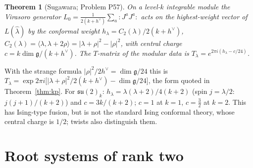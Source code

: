 \documentclass[11pt]{article}
\newtheorem{theorem}{Theorem}[section]
\theoremstyle{definition}
\theoremstyle{remark}
\begin{document}
\begin{theorem}[Sugawara; Problem P57]\label{thm:sugawara}
On a level-$k$ integrable module the Virasoro generator
$L_0 = \tfrac{1}{2(k+h^\vee)}\sum_a{:}J^aJ^a{:}$ acts on the highest-weight
vector of $L(\hat\lambda)$ by the \emph{conformal weight}
$h_\lambda = C_2(\lambda)/2(k+h^\vee)$,
$C_2(\lambda) = \langle\lambda,\lambda+2\rho\rangle = |\lambda+\rho|^2-|\rho|^2$,
with \emph{central charge} $c = k\dim\mathfrak g/(k+h^\vee)$. The
$T$-matrix of the modular data is $T_\lambda = e^{2\pi i(h_\lambda-c/24)}$.
\end{theorem}

With the strange formula $|\rho|^2/2h^\vee = \dim\mathfrak g/24$ this is
$T_\lambda = \exp2\pi i\big[|\lambda+\rho|^2/2(k+h^\vee)-\dim\mathfrak g/24\big]$,
the form quoted in Theorem~\ref{thm:kp}. For $\mathfrak{su}(2)_k$:
$h_\lambda = \lambda(\lambda+2)/4(k+2)$ (spin $j = \lambda/2$:
$j(j+1)/(k+2)$) and $c = 3k/(k+2)$; $c = 1$ at $k = 1$, $c = \tfrac32$
at $k = 2$. This has Ising-type fusion, but is not the standard Ising
conformal theory, whose central charge is $1/2$; twists also distinguish them.

\section{Root systems of rank two}\label{sec:roots}
\end{document}

